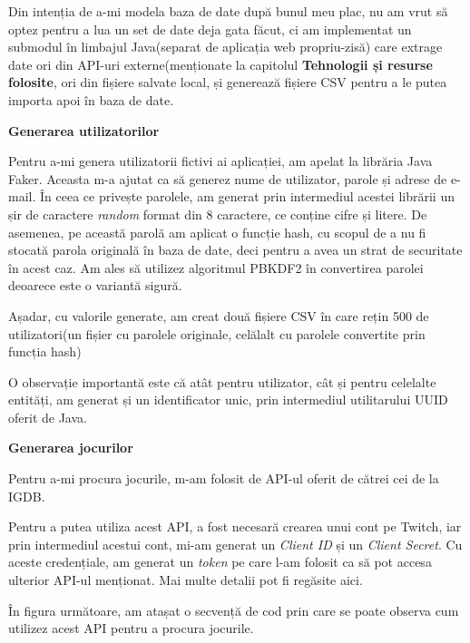 \documentclass[12pt,a4paper]{report}
\begin{document}
Din intenția de a-mi modela baza de date după bunul meu plac, nu am vrut să optez pentru a lua un set de date deja gata făcut, ci am implementat un submodul în limbajul Java(separat de aplicația web propriu-zisă) care extrage date ori din API-uri externe(menționate la capitolul \textbf{Tehnologii și resurse folosite}, ori din fișiere salvate local, și generează fișiere CSV pentru a le putea importa apoi în baza de date.

\bigskip
\textbf{Generarea utilizatorilor}
\bigskip

Pentru a-mi genera utilizatorii fictivi ai aplicației, am apelat la librăria Java Faker. Aceasta m-a ajutat ca să generez nume de utilizator, parole și adrese de e-mail. În ceea ce privește parolele, am generat prin intermediul acestei librării un șir de caractere \emph{random} format din 8 caractere, ce conține cifre și litere. De asemenea, pe această parolă am aplicat o funcție hash, cu scopul de a nu fi stocată parola originală în baza de date, deci pentru a avea un strat de securitate în acest caz. Am ales să utilizez algoritmul PBKDF2 în convertirea parolei deoarece este o variantă sigură. \cite{15}

Așadar, cu valorile generate, am creat două fișiere CSV în care rețin 500 de utilizatori(un fișier cu parolele originale, celălalt cu parolele convertite prin funcția hash)

O observație importantă este că atât pentru utilizator, cât și pentru celelalte entități, am generat și un identificator unic, prin intermediul utilitarului UUID oferit de Java.

\bigskip
\textbf{Generarea jocurilor}
\bigskip

Pentru a-mi procura jocurile, m-am folosit de API-ul oferit de cătrei cei de la IGDB.

Pentru a putea utiliza acest API, a fost necesară crearea unui cont pe Twitch, iar prin intermediul acestui cont, mi-am generat un \emph{Client ID} și un \emph{Client Secret}. Cu aceste credențiale, am generat un \emph{token} pe care l-am folosit ca să pot accesa ulterior API-ul menționat. Mai multe detalii pot fi regăsite aici. \cite{16}

În figura următoare, am atașat o secvență de cod prin care se poate observa cum utilizez acest API pentru a procura jocurile.
\end{document}
